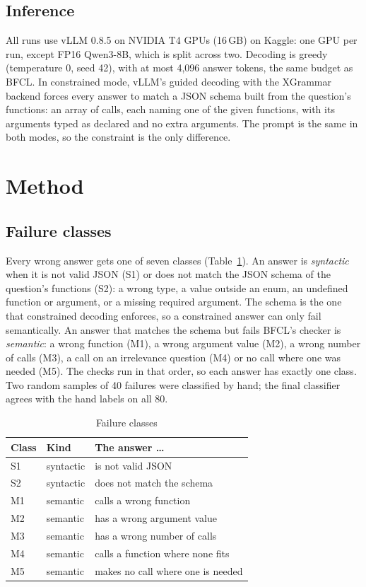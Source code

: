 \documentclass[conference]{IEEEtran}
\begin{document}
\subsection{Inference}
All runs use vLLM 0.8.5 on NVIDIA T4 GPUs (16\,GB) on Kaggle: one GPU per run, except FP16
Qwen3-8B, which is split across two. Decoding is greedy (temperature 0, seed 42), with at most
4,096 answer tokens, the same budget as BFCL. In constrained mode, vLLM's guided decoding with the
XGrammar backend forces every answer to match a JSON schema built from the question's functions:
an array of calls, each naming one of the given functions, with its arguments typed as declared
and no extra arguments. The prompt is the same in both modes, so the constraint is the only
difference.

\section{Method}\label{sec:method}

\subsection{Failure classes}
Every wrong answer gets one of seven classes (Table~\ref{tab:classes}). An answer is \emph{syntactic}
when it is not valid JSON (S1) or does not match the JSON schema of the question's functions (S2): a
wrong type, a value outside an enum, an undefined function or argument, or a missing required
argument. The schema is the one that constrained decoding enforces, so a constrained answer can only
fail semantically. An answer that matches the schema but fails BFCL's checker is \emph{semantic}:
a wrong function (M1), a wrong argument value (M2), a wrong number of calls (M3), a call on an
irrelevance question (M4) or no call where one was needed (M5). The checks run in that order, so
each answer has exactly one class. Two random samples of 40 failures were classified by hand; the
final classifier agrees with the hand labels on all 80.

\begin{table}[t]
\centering
\caption{Failure classes}\label{tab:classes}
\begin{tabular}{lll}
\toprule
Class & Kind & The answer \ldots \\
\midrule
S1 & syntactic & is not valid JSON \\
S2 & syntactic & does not match the schema \\
M1 & semantic & calls a wrong function \\
M2 & semantic & has a wrong argument value \\
M3 & semantic & has a wrong number of calls \\
M4 & semantic & calls a function where none fits \\
M5 & semantic & makes no call where one is needed \\
\bottomrule
\end{tabular}
\end{table}
\end{document}
